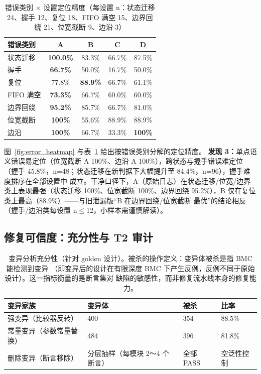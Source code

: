 \documentclass[twocolumn,10pt]{ctexart}
\begin{document}
\begin{table}[!t]
\centering
\caption{错误类别 $\times$ 设置定位精度（每设置 n：状态迁移 24、握手 12、复位 18、FIFO 满空
15、边界回绕 21、位宽截断 9、边沿 3）}
\label{tab:error_matrix}
\scriptsize
\setlength{\tabcolsep}{4pt}
\renewcommand{\arraystretch}{1.12}
\begin{tabular}{p{}cccc}
\toprule
\textbf{错误类别} & \textbf{A} & \textbf{B} & \textbf{C} & \textbf{D} \\
\midrule
状态迁移 & \textbf{100.0\%} & 83.3\% & 66.7\% & 87.5\% \\
握手 & \textbf{66.7\%} & 50.0\% & 16.7\% & 50.0\% \\
复位 & 77.8\% & \textbf{88.9\%} & 66.7\% & 61.1\% \\
FIFO 满空 & \textbf{73.3\%} & 66.7\% & 60.0\% & 60.0\% \\
边界回绕 & \textbf{95.2\%} & 85.7\% & 66.7\% & 81.0\% \\
位宽截断 & \textbf{100\%} & 55.6\% & 88.9\% & 88.9\% \\
边沿 & \textbf{100\%} & 66.7\% & 33.3\% & \textbf{100\%} \\
\bottomrule
\end{tabular}
\end{table}

图~\ref{fig:error_heatmap} 与表~\ref{tab:error_matrix} 给出按错误类别分解的定位精度。
\textbf{发现 3：}单点语义错误易定位（位宽截断 A 100\%、边沿 A 100\%），跨状态与握手错误难定位
（握手 45.8\%，n=48；状态迁移在新判据下大幅提升至 84.4\%，n=96），握手难度排序在全部设置中
成立。干净口径下，A（原始日志）在状态迁移/位宽/边界类上表现最强（状态迁移 100\%、位宽截断
100\%、边界回绕 95.2\%），B 仅在复位类上最高（88.9\%）——与旧泄漏版“B 在边界回绕/位宽截断
最优”的结论相反（握手/边沿类每设置 n$\le$12，小样本需谨慎解读）。

\subsection{修复可信度：充分性与 T2 审计}

\begin{table}[!t]
\centering
\caption{变异分析充分性（针对 golden 设计）。被杀的操作定义：变异体被杀是指 BMC 能检测到变异
（即变异后的设计在有限深度 BMC 下产生反例，反例不同于原始设计）。这一指标衡量的是断言集对
缺陷的敏感性，而非修复流水线本身的修复能力。}
\label{tab:sufficiency}
\scriptsize
\setlength{\tabcolsep}{2pt}
\renewcommand{\arraystretch}{1.12}
\begin{tabular}{p{}p{}p{}p{}}
\toprule
\textbf{变异家族} & \textbf{变异体} & \textbf{被杀} & \textbf{比率} \\
\midrule
强变异（比较器反转） & 400 & 354 & 88.5\% \\
常量变异（参数常量替换） & 484 & 396 & 81.8\% \\
删除变异（断言移除） & 分层抽样（每模块 2～4 个断言） & 全部 PASS & 空泛性控制 \\
\bottomrule
\end{tabular}
\end{table}
\end{document}

